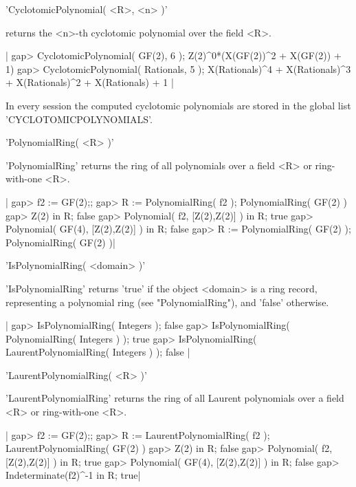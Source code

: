
'CyclotomicPolynomial( <R>, <n> )'

returns the <n>-th cyclotomic polynomial over the field <R>.

|    gap> CyclotomicPolynomial( GF(2), 6 );
    Z(2)^0*(X(GF(2))^2 + X(GF(2)) + 1)
    gap> CyclotomicPolynomial( Rationals, 5 );
    X(Rationals)^4 + X(Rationals)^3 + X(Rationals)^2 + X(Rationals) + 1 |

In every {\GAP} session the computed cyclotomic polynomials are stored in
the global list 'CYCLOTOMICPOLYNOMIALS'.


'PolynomialRing( <R> )'

'PolynomialRing' returns the ring of all polynomials  over a field <R> or
ring-with-one <R>.

|    gap> f2 := GF(2);;                
    gap> R := PolynomialRing( f2 );
    PolynomialRing( GF(2) )
    gap> Z(2) in R;
    false
    gap> Polynomial( f2, [Z(2),Z(2)] ) in R;
    true
    gap> Polynomial( GF(4), [Z(2),Z(2)] ) in R;
    false
    gap> R := PolynomialRing( GF(2) );
    PolynomialRing( GF(2) )|



'IsPolynomialRing( <domain> )'


'IsPolynomialRing'  returns 'true'  if  the object  <domain>  is  a  ring
record,  representing  a  polynomial  ring  (see  "PolynomialRing"),  and
'false' otherwise.
    
|    gap> IsPolynomialRing( Integers );                  
    false
    gap> IsPolynomialRing( PolynomialRing( Integers ) );
    true
    gap> IsPolynomialRing( LaurentPolynomialRing( Integers ) );
    false |



'LaurentPolynomialRing( <R> )'

'LaurentPolynomialRing'  returns the ring of all Laurent polynomials over
a field <R> or ring-with-one <R>.

|    gap> f2 := GF(2);;
    gap> R := LaurentPolynomialRing( f2 );
    LaurentPolynomialRing( GF(2) )
    gap> Z(2) in R;
    false
    gap> Polynomial( f2, [Z(2),Z(2)] ) in R;   
    true
    gap> Polynomial( GF(4), [Z(2),Z(2)] ) in R;
    false
    gap> Indeterminate(f2)^-1 in R;
    true|


